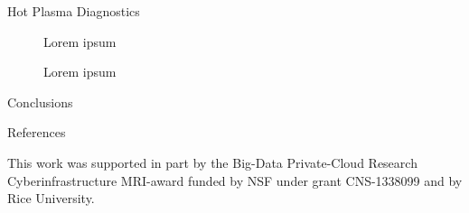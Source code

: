 \documentclass[final]{beamer}
\begin{document}
\begin{frame}
\begin{columns}[t]
\begin{column}{0.49\linewidth}
\begin{block}{Hot Plasma Diagnostics}
\begin{figure}
{        \label{fig:ratio_electron_twait}}
        \caption{Lorem ipsum}
      \end{figure}
      \begin{figure}
        \centering
        \caption{Lorem ipsum}
      \end{figure}
    \end{block}
    \begin{block}{Conclusions}
    \end{block}
    \begin{block}{References}
      \scriptsize
      \begin{multicols}{2}
        
        
      \end{multicols}
      This work was supported in part by the Big-Data Private-Cloud Research Cyberinfrastructure MRI-award funded by NSF under grant CNS-1338099 and by Rice University.
    \end{block}
  \end{column}
  \end{columns}
\end{frame}
\end{document}
